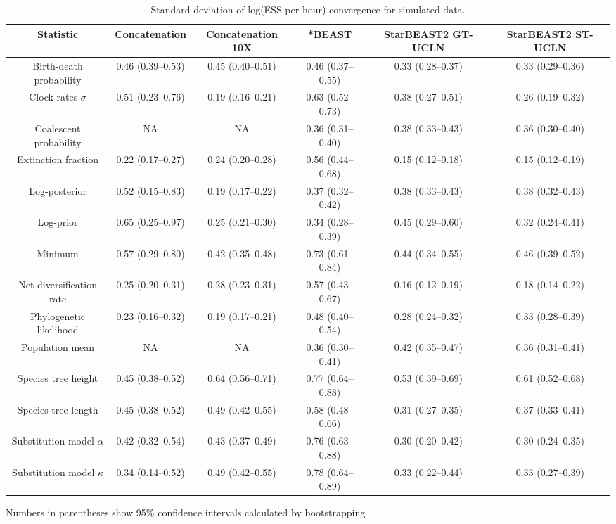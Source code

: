 \documentclass[12pt]{article}
\begin{document}
\begin{landscape}
\clearpage

\begin{table}[htb!]
\centering
\caption{Standard deviation of log(ESS per hour) convergence for simulated data.}
\label{tab:simulatedPerHourSD}
\begin{threeparttable}
\begin{adjustbox}{center}
\renewcommand{\arraystretch}{1.2}
\footnotesize
\begin{tabular}{|c|c|c|c|c|c|}
\multicolumn{1}{c}{Statistic} & \multicolumn{1}{c}{Concatenation} & \multicolumn{1}{c}{Concatenation 10X} & \multicolumn{1}{c}{*BEAST} & \multicolumn{1}{c}{StarBEAST2 GT-UCLN} & \multicolumn{1}{c}{StarBEAST2 ST-UCLN}\tabularnewline
\hline
Birth-death probability & 0.46 (0.39--0.53) & 0.45 (0.40--0.51) & 0.46 (0.37--0.55) & 0.33 (0.28--0.37) & 0.33 (0.29--0.36)\tabularnewline
\hline
Clock rates $\sigma$ & 0.51 (0.23--0.76) & 0.19 (0.16--0.21) & 0.63 (0.52--0.73) & 0.38 (0.27--0.51) & 0.26 (0.19--0.32)\tabularnewline
\hline
Coalescent probability & NA & NA & 0.36 (0.31--0.40) & 0.38 (0.33--0.43) & 0.36 (0.30--0.40)\tabularnewline
\hline
Extinction fraction & 0.22 (0.17--0.27) & 0.24 (0.20--0.28) & 0.56 (0.44--0.68) & 0.15 (0.12--0.18) & 0.15 (0.12--0.19)\tabularnewline
\hline
Log-posterior & 0.52 (0.15--0.83) & 0.19 (0.17--0.22) & 0.37 (0.32--0.42) & 0.38 (0.33--0.43) & 0.38 (0.32--0.43)\tabularnewline
\hline
Log-prior & 0.65 (0.25--0.97) & 0.25 (0.21--0.30) & 0.34 (0.28--0.39) & 0.45 (0.29--0.60) & 0.32 (0.24--0.41)\tabularnewline
\hline
Minimum & 0.57 (0.29--0.80) & 0.42 (0.35--0.48) & 0.73 (0.61--0.84) & 0.44 (0.34--0.55) & 0.46 (0.39--0.52)\tabularnewline
\hline
Net diversification rate & 0.25 (0.20--0.31) & 0.28 (0.23--0.31) & 0.57 (0.43--0.67) & 0.16 (0.12--0.19) & 0.18 (0.14--0.22)\tabularnewline
\hline
Phylogenetic likelihood & 0.23 (0.16--0.32) & 0.19 (0.17--0.21) & 0.48 (0.40--0.54) & 0.28 (0.24--0.32) & 0.33 (0.28--0.39)\tabularnewline
\hline
Population mean & NA & NA & 0.36 (0.30--0.41) & 0.42 (0.35--0.47) & 0.36 (0.31--0.41)\tabularnewline
\hline
Species tree height & 0.45 (0.38--0.52) & 0.64 (0.56--0.71) & 0.77 (0.64--0.88) & 0.53 (0.39--0.69) & 0.61 (0.52--0.68)\tabularnewline
\hline
Species tree length & 0.45 (0.38--0.52) & 0.49 (0.42--0.55) & 0.58 (0.48--0.66) & 0.31 (0.27--0.35) & 0.37 (0.33--0.41)\tabularnewline
\hline
Substitution model $\alpha$ & 0.42 (0.32--0.54) & 0.43 (0.37--0.49) & 0.76 (0.63--0.88) & 0.30 (0.20--0.42) & 0.30 (0.24--0.35)\tabularnewline
\hline
Substitution model $\kappa$ & 0.34 (0.14--0.52) & 0.49 (0.42--0.55) & 0.78 (0.64--0.89) & 0.33 (0.22--0.44) & 0.33 (0.27--0.39)\tabularnewline
\hline
\end{tabular}
\end{adjustbox}
\begin{tablenotes}
\footnotesize
\item Numbers in parentheses show 95\% confidence intervals calculated by bootstrapping
\end{tablenotes}
\end{threeparttable}
\end{table}


\end{landscape}
\end{document}
